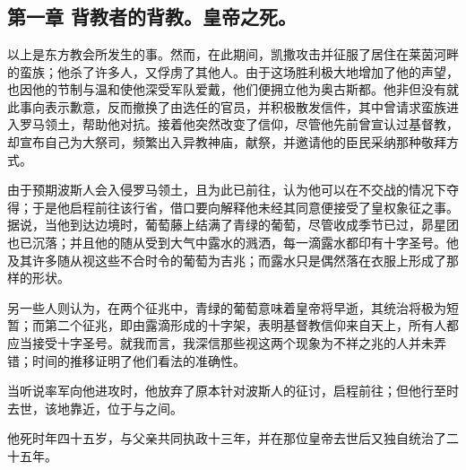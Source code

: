 
\section{}


\subsection{第一章 背教者的背教。皇帝之死。}

以上是东方教会所发生的事。然而，在此期间，凯撒攻击并征服了居住在莱茵河畔的蛮族；他杀了许多人，又俘虏了其他人。由于这场胜利极大地增加了他的声望，也因他的节制与温和使他深受军队爱戴，他们便拥立他为奥古斯都。他非但没有就此事向表示歉意，反而撤换了由选任的官员，并积极散发信件，其中曾请求蛮族进入罗马领土，帮助他对抗。接着他突然改变了信仰，尽管他先前曾宣认过基督教，却宣布自己为大祭司，频繁出入异教神庙，献祭，并邀请他的臣民采纳那种敬拜方式。\par

由于预期波斯人会入侵罗马领土，且为此已前往，认为他可以在不交战的情况下夺得；于是他启程前往该行省，借口要向解释他未经其同意便接受了皇权象征之事。据说，当他到达边境时，葡萄藤上结满了青绿的葡萄，尽管收成季节已过，昴星团也已沉落；并且他的随从受到大气中露水的溅洒，每一滴露水都印有十字圣号。他及其许多随从视这些不合时令的葡萄为吉兆；而露水只是偶然落在衣服上形成了那样的形状。\par

另一些人则认为，在两个征兆中，青绿的葡萄意味着皇帝将早逝，其统治将极为短暂；而第二个征兆，即由露滴形成的十字架，表明基督教信仰来自天上，所有人都应当接受十字圣号。就我而言，我深信那些视这两个现象为不祥之兆的人并未弄错；时间的推移证明了他们看法的准确性。\par

当听说率军向他进攻时，他放弃了原本针对波斯人的征讨，启程前往；但他行至时去世，该地靠近，位于与之间。\par

他死时年四十五岁，与父亲共同执政十三年，并在那位皇帝去世后又独自统治了二十五年。\par

